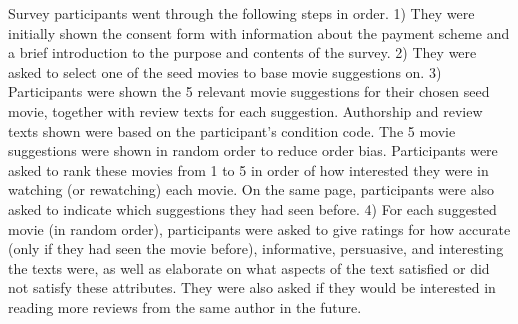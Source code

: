 Survey participants went through the following steps in order.
1) They were initially shown the consent form with information about the payment scheme and a brief introduction to the purpose and contents of the survey.
2) They were asked to select one of the seed movies to base movie suggestions on.
3) Participants were shown the 5 relevant movie suggestions for their chosen seed movie, together with review texts for each suggestion.
Authorship and review texts shown were based on the participant's condition code.
The 5 movie suggestions were shown in random order to reduce order bias.
Participants were asked to rank these movies from 1 to 5 in order of how interested they were in watching (or rewatching) each movie.
On the same page, participants were also asked to indicate which suggestions they had seen before.
4) For each suggested movie (in random order), participants were asked to give ratings for how accurate (only if they had seen the movie before), informative, persuasive, and interesting the texts were, as well as elaborate on what aspects of the text satisfied or did not satisfy these attributes.
They were also asked if they would be interested in reading more reviews from the same author in the future.
